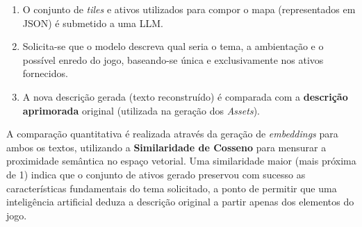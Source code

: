 \begin{enumerate}
    \item O conjunto de \textit{tiles} e ativos utilizados para compor o mapa
          (representados em \gls{JSON}) é submetido a uma \gls{LLM}.
    \item Solicita-se que o modelo descreva qual seria o tema, a ambientação e o
          possível enredo do jogo, baseando-se única e exclusivamente nos ativos
          fornecidos.
    \item A nova descrição gerada (texto reconstruído) é comparada com a
          \textbf{descrição aprimorada} original (utilizada na geração dos
          \textit{Assets}).
\end{enumerate}

A comparação quantitativa é realizada através da geração de \textit{embeddings}
para ambos os textos, utilizando a \textbf{Similaridade de Cosseno} para mensurar
a proximidade semântica no espaço vetorial. Uma similaridade maior (mais próxima
de 1) indica que o conjunto de ativos gerado preservou com sucesso as
características fundamentais do tema solicitado, a ponto de permitir que uma
inteligência artificial deduza a descrição original a partir apenas dos elementos
do jogo.